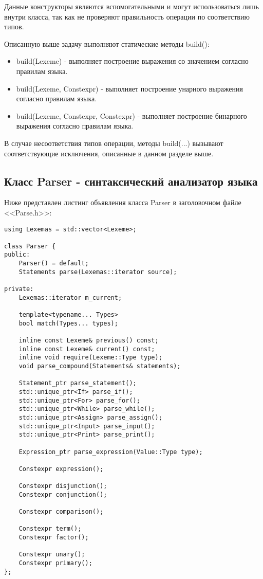Данные конструкторы являются вспомогательными и могут
использоваться лишь внутри класса, так как не проверяют
правильность операции по соответствию типов. 

Описанную выше задачу выполняют статические методы build():
\begin{itemize}
    \item build(Lexeme) - выполняет построение выражения 
          со значением согласно правилам языка.
        
    \item build(Lexeme, Constexpr) - выполняет построение
          унарного выражения согласно правилам языка.

    \item build(Lexeme, Constexpr, Constexpr) - выполняет
          построение бинарного выражения согласно правилам языка.
\end{itemize}

В случае несоответствия типов операции, методы build(...)
вызывают соответствующие исключения, 
описанные в данном разделе выше.

\subsection{Класс Parser - синтаксический анализатор языка}

Ниже представлен листинг объявления класса Parser
в заголовочном файле <<Parse.h>>:

\begin{verbatim}
using Lexemas = std::vector<Lexeme>;

class Parser {
public:
    Parser() = default;
    Statements parse(Lexemas::iterator source);

private:
    Lexemas::iterator m_current;

    template<typename... Types>
    bool match(Types... types);

    inline const Lexeme& previous() const;
    inline const Lexeme& current() const;
    inline void require(Lexeme::Type type);
    void parse_compound(Statements& statements);

    Statement_ptr parse_statement();
    std::unique_ptr<If> parse_if();
    std::unique_ptr<For> parse_for();
    std::unique_ptr<While> parse_while();
    std::unique_ptr<Assign> parse_assign();
    std::unique_ptr<Input> parse_input();
    std::unique_ptr<Print> parse_print();

    Expression_ptr parse_expression(Value::Type type);

    Constexpr expression();

    Constexpr disjunction();
    Constexpr conjunction();

    Constexpr comparison();

    Constexpr term();
    Constexpr factor();

    Constexpr unary();
    Constexpr primary();
};
\end{verbatim}

